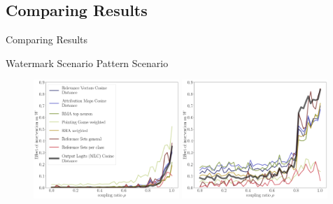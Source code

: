 \documentclass[German, aspectratio=169]{beamer}
\begin{document}
\subsection{Comparing Results}
\begin{frame}[t]{Comparing Results}
    \begin{center}
        Watermark Scenario \hspace{3.5cm}  Pattern Scenario
    \end{center}
    \begin{figure}[t!]
        \includegraphics[width=0.49\textwidth]{images/all_results_watermark.png}
        \includegraphics[width=0.49\textwidth]{images/all_results.png}
    \end{figure}
\end{frame}

\end{document}
